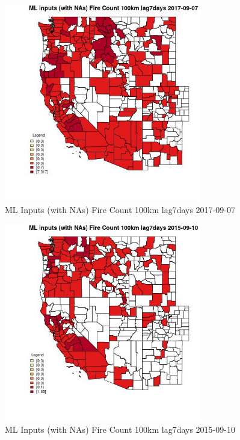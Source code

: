 \clearpage 

\begin{figure} 
\centering  
\includegraphics[width=0.77\textwidth]{Code_Outputs/Report_ML_input_PM25_Step4_part_e_de_duplicated_aves_compiled_2019-05-20wNAs_CountyFire_Count_100km_lag7daysMean2017-09-07.jpg} 
\caption{\label{fig:Report_ML_input_PM25_Step4_part_e_de_duplicated_aves_compiled_2019-05-20wNAsCountyFire_Count_100km_lag7daysMean2017-09-07}ML Inputs (with NAs) Fire Count 100km lag7days 2017-09-07} 
\end{figure} 
 

\begin{figure} 
\centering  
\includegraphics[width=0.77\textwidth]{Code_Outputs/Report_ML_input_PM25_Step4_part_e_de_duplicated_aves_compiled_2019-05-20wNAs_CountyFire_Count_100km_lag7daysMean2015-09-10.jpg} 
\caption{\label{fig:Report_ML_input_PM25_Step4_part_e_de_duplicated_aves_compiled_2019-05-20wNAsCountyFire_Count_100km_lag7daysMean2015-09-10}ML Inputs (with NAs) Fire Count 100km lag7days 2015-09-10} 
\end{figure} 
 

